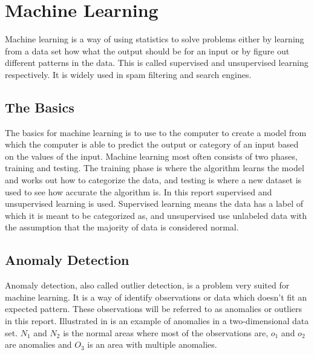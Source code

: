 \chapter{Machine Learning}
\label{chp:machine_learning}

Machine learning is a way of using statistics to solve problems either by learning from a data set how what the output should be for an input or by figure out different patterns in the data. This is called supervised and unsupervised learning respectively. It is widely used in spam filtering and search engines.

\section{The Basics}
The basics for machine learning is to use to the computer to create a model from which the computer is able to predict the output or category of an input based on the values of the input. 
Machine learning most often consists of two phases, training and testing. The training phase is where the algorithm learns the model and works out how to categorize the data, and testing is where a new dataset is used to see how accurate the algorithm is. 
In this report supervised and unsupervised learning is used. Supervised learning means the data has a label of which it is meant to be categorized as, and unsupervised use unlabeled data with the assumption that the majority of data is considered normal.

\section{Anomaly Detection}
Anomaly detection, also called outlier detection, is a problem very suited for machine learning. It is a way of identify observations or data which doesn't fit an expected pattern. These observations will be referred to as anomalies or outliers in this report. Illustrated in  is an example of anomalies in a two-dimensional data set. $N_1$ and $N_2$ is the normal areas where most of the observations are, $o_1$ and $o_2$ are anomalies and $O_3$ is an area with multiple anomalies. 

